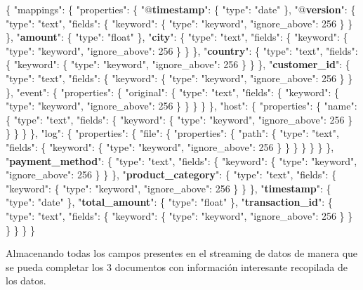\{ "mappings": \{ "properties": \{ 
"@\textbf{timestamp}": \{ "type": "date" \}, 
"@\textbf{version}": \{ "type": "text", "fields": \{ "keyword": \{ "type": "keyword", "ignore\_above": 256 \} \} \}, 
"\textbf{amount}": \{ "type": "float" \}, 
"\textbf{city}": \{ "type": "text", "fields": \{ "keyword": \{ "type": "keyword", "ignore\_above": 256 \} \} \}, 
"\textbf{country}": \{ "type": "text", "fields": \{ "keyword": \{ "type": "keyword", "ignore\_above": 256 \} \} \}, 
"\textbf{customer\_id}": \{ "type": "text", "fields": \{ "keyword": \{ "type": "keyword", "ignore\_above": 256 \} \} \}, "event": \{ "properties": \{ "original": \{ "type": "text", "fields": \{ "keyword": \{ "type": "keyword", "ignore\_above": 256 \} \} \} \} \}, "host": \{ "properties": \{ "name": \{ "type": "text", "fields": \{ "keyword": \{ "type": "keyword", "ignore\_above": 256 \} \} \} \} \}, "log": \{ "properties": \{ "file": \{ "properties": \{ "path": \{ "type": "text", "fields": \{ "keyword": \{ "type": "keyword", "ignore\_above": 256 \} \} \} \} \} \} \}, 
"\textbf{payment\_method}": \{ "type": "text", "fields": \{ "keyword": \{ "type": "keyword", "ignore\_above": 256 \} \} \}, 
"\textbf{product\_category}": \{ "type": "text", "fields": \{ "keyword": \{ "type": "keyword", "ignore\_above": 256 \} \} \}, 
"\textbf{timestamp}": \{ "type": "date" \}, 
"\textbf{total\_amount}": \{ "type": "float" \}, 
"\textbf{transaction\_id}": \{ "type": "text", "fields": \{ "keyword": \{ "type": "keyword", "ignore\_above": 256 \} \} \} \} \} \} 

Almacenando todas los campos presentes en el streaming de datos de manera que se pueda completar los 3 documentos con información interesante recopilada de los datos.

\paragraph{}
\paragraph{}
\paragraph{}
\paragraph{}
\paragraph{}
